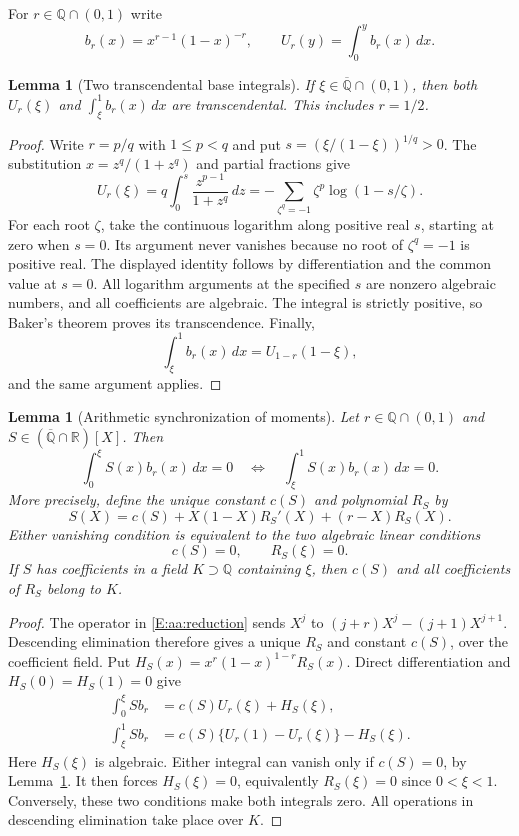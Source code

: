 \documentclass[11pt,a4paper]{article}
\newtheorem{lemma}[theorem]{Lemma}
\theoremstyle{definition}
\theoremstyle{remark}
\numberwithin{equation}{section}
\begin{document}
For $r\in\mathbb Q\cap(0,1)$ write
\[
 b_r(x)=x^{r-1}(1-x)^{-r},\qquad
 U_r(y)=\int_0^y b_r(x)\,dx.
\]

\begin{lemma}[Two transcendental base integrals]\label{E:aa:base}
If $\xi\in\overline{\mathbb Q}\cap(0,1)$, then both
$U_r(\xi)$ and $\int_\xi^1 b_r(x)\,dx$ are transcendental.
This includes $r=1/2$.
\end{lemma}

\begin{proof}
Write $r=p/q$ with $1\le p<q$ and put
$s=(\xi/(1-\xi))^{1/q}>0$. The substitution
$x=z^q/(1+z^q)$ and partial fractions give
\[
 U_r(\xi)=q\int_0^s\frac{z^{p-1}}{1+z^q}\,dz
 =-\sum_{\zeta^q=-1}\zeta^p\log(1-s/\zeta).
\]
For each root $\zeta$, take the continuous logarithm along positive
real $s$, starting at zero when $s=0$. Its argument never vanishes
because no root of $\zeta^q=-1$ is positive real. The displayed
identity follows by differentiation and the common value at $s=0$.
All logarithm arguments at the specified $s$ are nonzero algebraic
numbers, and all coefficients are algebraic. The integral is strictly
positive, so Baker's theorem proves its transcendence. Finally,
\[
 \int_\xi^1 b_r(x)\,dx=U_{1-r}(1-\xi),
\]
and the same argument applies.
\end{proof}

\begin{lemma}[Arithmetic synchronization of moments]
\label{E:aa:synchronization}
Let $r\in\mathbb Q\cap(0,1)$ and
$S\in(\overline{\mathbb Q}\cap\mathbb R)[X]$. Then
\[
 \int_0^\xi S(x)b_r(x)\,dx=0
 \quad\Longleftrightarrow\quad
 \int_\xi^1 S(x)b_r(x)\,dx=0.
\]
More precisely, define the unique constant $c(S)$ and polynomial
$R_S$ by
\begin{equation}\label{E:aa:reduction}
 S(X)=c(S)+X(1-X)R_S'(X)+(r-X)R_S(X).
\end{equation}
Either vanishing condition is equivalent to the two algebraic
linear conditions
\begin{equation}\label{E:aa:algebraic-conditions}
 c(S)=0,\qquad R_S(\xi)=0.
\end{equation}
If $S$ has coefficients in a field $K\supset\mathbb Q$
containing $\xi$, then $c(S)$ and all coefficients of $R_S$
belong to $K$.
\end{lemma}

\begin{proof}
The operator in \eqref{E:aa:reduction} sends $X^j$ to
$(j+r)X^j-(j+1)X^{j+1}$. Descending elimination therefore gives
a unique $R_S$ and constant $c(S)$, over the coefficient field.
Put $H_S(x)=x^r(1-x)^{1-r}R_S(x)$. Direct differentiation and
$H_S(0)=H_S(1)=0$ give
\begin{align*}
 \int_0^\xi S b_r&=c(S)U_r(\xi)+H_S(\xi),\\
 \int_\xi^1 S b_r&=c(S)\{U_r(1)-U_r(\xi)\}-H_S(\xi).
\end{align*}
Here $H_S(\xi)$ is algebraic. Either integral can vanish only if
$c(S)=0$, by Lemma~\ref{E:aa:base}. It then forces
$H_S(\xi)=0$, equivalently $R_S(\xi)=0$ since
$0<\xi<1$. Conversely, these two conditions make both integrals
zero. All operations in descending elimination take place over $K$.
\end{proof}
\end{document}
